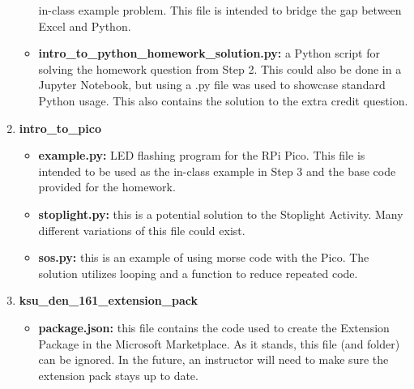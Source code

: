 \begin{enumerate}
\begin{itemize}
            in-class example problem. This file is intended to 
            bridge the gap between Excel and Python.
            \item \textbf{intro\_to\_python\_homework\_solution.py:} 
            a Python script for solving the homework question from 
            Step 2. This could also be done in a Jupyter Notebook, 
            but using a .py file was used to showcase standard
            Python usage. This also contains the solution to the 
            extra credit question.
        \end{itemize}
    \item \textbf{intro\_to\_pico}
        \begin{itemize}
            \item \textbf{example.py:} LED flashing program for the 
            RPi Pico. This file is intended to be used as the in-class 
            example in Step 3 and the base code provided for the homework.
            \item \textbf{stoplight.py:} this is a potential solution 
            to the Stoplight Activity. Many different variations of 
            this file could exist.
            \item \textbf{sos.py:} this is an example of using 
            morse code with the Pico. The solution utilizes looping
            and a function to reduce repeated code.
        \end{itemize}
    \item \textbf{ksu\_den\_161\_extension\_pack}
        \begin{itemize}
            \item \textbf{package.json:} this file contains the code 
            used to create the Extension Package in the Microsoft 
            Marketplace. As it stands, this file (and folder) can be 
            ignored. In the future, an instructor will need to make 
            sure the extension pack stays up to date.
        \end{itemize}
\end{enumerate}